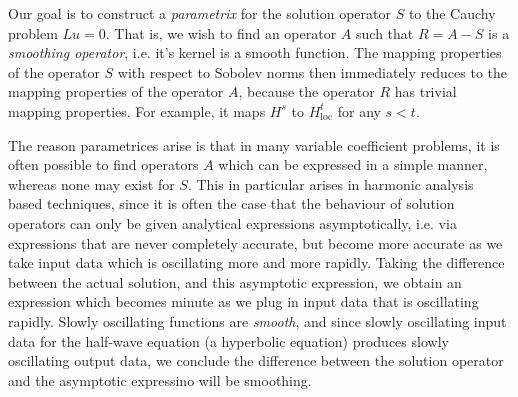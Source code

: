 \documentclass{article}
\theoremstyle{plain}
\theoremstyle{remark}
\theoremstyle{definition}
\begin{document}
Our goal is to construct a \emph{parametrix} for the solution operator $S$ to the Cauchy problem $Lu = 0$. That is, we wish to find an operator $A$ such that $R = A - S$ is a \emph{smoothing operator}, i.e. it's kernel is a smooth function. The mapping properties of the operator $S$ with respect to Sobolev norms then immediately reduces to the mapping properties of the operator $A$, because the operator $R$ has trivial mapping properties. For example, it maps $H^s$ to $H^t_{\text{loc}}$ for any $s < t$.

The reason parametrices arise is that in many variable coefficient problems, it is often possible to find operators $A$ which can be expressed in a simple manner, whereas none may exist for $S$. This in particular arises in harmonic analysis based techniques, since it is often the case that the behaviour of solution operators can only be given analytical expressions asymptotically, i.e. via expressions that are never completely accurate, but become more accurate as we take input data which is oscillating more and more rapidly. Taking the difference between the actual solution, and this asymptotic expression, we obtain an expression which becomes minute as we plug in input data that is oscillating rapidly. Slowly oscillating functions are \emph{smooth}, and since slowly oscillating input data for the half-wave equation (a hyperbolic equation) produces slowly oscillating output data, we conclude the difference between the solution operator and the asymptotic expressino will be smoothing.
\end{document}
